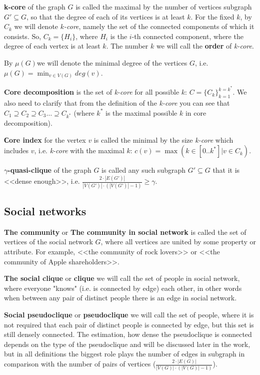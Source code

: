 \documentclass[11pt,a4paper,oneside]{article}
\begin{document}
\textbf{k-core} of the graph $G$ is called the maximal by the number of vertices subgraph $G' \subseteq G$, so that the degree of each of its vertices is at least $k$. For the fixed $k$, by $C_k$ we will denote \textit{$k$-core}, namely the set of the connected components of which it consists. So, $C_k = \{H_i\}$, where $H_i$ is the $i$-th connected component, where the degree of each vertex is at least $k$. The number $k$ we will call the \textbf{order} of \textit{k-core}.

By \boldmath$\mu(G)$\unboldmath we will denote the minimal degree of the vertices $G$, i.e. $\mu(G) = \min_{v \in V(G)} deg(v)$.

\textbf{Core decomposition} is the set of \textit{k-core} for all possible $k$: $C = \{C_k\}_{k=1}^{k=k^*}$. We also need to clarify that from the definition of the \textit{k-core} you can see that $C_1 \supseteq C_2 \supseteq C_3 \ldots \supseteq C_{k^*}$ (where $k^*$ is the maximal possible $k$ in core decomposition).

\textbf{Сore index} for the vertex $v$ is called the minimal by the size \textit{k-core} which includes $v$, i.e. \textit{k-core} with the maximal $k$: $c(v) = \max(k \in [0..k^*] | v \in C_k)$.

\textbf{$\gamma$-quasi-clique} of the graph $G$ is called any such subgraph $G' \subseteq G$ that it is <<dense enough>>, i.e. $\frac{2 \cdot |E(G')|}{|V(G')| \cdot (|V(G')| - 1)} \ge \gamma$.

\subsection{Social networks}

\textbf{The community} or \textbf{The community in social network} is called the set of vertices of the social network $G$, where all vertices are united by some property or attribute. For example, <<the community of rock lovers>> or <<the community of Apple shareholders>>.

\textbf{The social clique} or \textbf{clique} we will call the set of people in social network, where everyone "knows" (i.e. is connected by edge) each other, in other words when between any pair of distinct people there is an edge in social network.

\textbf{Social pseudoclique} or \textbf{pseudoclique} we will call the set of people, where it is not required that each pair of distinct people is connected by edge, but this set is still densely connected. The estimation, how dense the pseudoclique is connected depends on the type of the pseudoclique and will be discussed later in the work, but in all definitions the biggest role plays the number of edges in subgraph in comparison with the number of pairs of vertices ($\frac{2 \cdot |E(G)|}{|V(G)| \cdot (|V(G)| - 1)}$).
\end{document}
